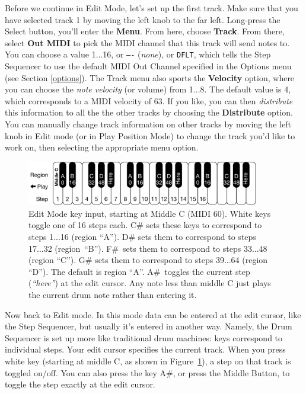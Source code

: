 \documentclass{article}
\begin{document}
Before we continue in Edit Mode, let's set up the first track.  Make sure that you have selected track 1 by moving the left knob to the far left.  Long-press the Select button, you'll enter the {\bf Menu}.  From here, choose {\bf Track}.  From there, select {\bf Out MIDI} to pick the MIDI channel that this track will send notes to.  You can choose a value 1...16, or \texttt{----} ({\it none}), or \texttt{DFLT}, which tells the Step Sequencer to use the default MIDI Out Channel specified in the Options menu (see Section \ref{options}).  The Track menu also sports the {\bf Velocity} option, where you can choose the {\it note velocity} (or volume) from 1...8.  The default value is 4, which corresponds to a MIDI velocity of 63.  If you like, you can then {\it distribute} this information to all the the other tracks by choosing the {\bf Distribute} option.  You can manually change track information on other tracks by moving the left knob in Edit mode (or in Play Position Mode) to change the track you'd like to work on, then selecting the appropriate menu option.

\begin{figure}
\vspace{-1em}
\hspace{\fill}\includegraphics[width=4in]{EditModeKeys}
\vspace{-1em}
\caption{\small Edit Mode key input, starting at Middle C (MIDI 60).  White keys toggle one of 16 steps each.  C\# sets these keys to correspond to steps 1...16 (region ``A'').  D\# sets them to correspond to steps 17...32 (region~``B'').  F\#~sets them to correspond to steps 33...48 (region ``C'').  G\# sets them to correspond to steps 39...64 (region ``D'').  The default is region ``A''.  A\#~toggles the current step ({\it ``here''}) at the edit cursor.  Any note less than middle C just plays the current drum note rather than entering it.
 }
\vspace{-1em}
\label{editmodekeys}
\end{figure}

Now back to Edit mode.  In this mode data can be entered at the edit cursor, like the Step Sequencer, but usually it's entered in another way.  Namely, the Drum Sequencer is set up more like traditional drum machines: keys correspond to individual steps.  Your edit cursor specifies the current track.  When you press white key (starting at middle C, as shown in Figure~\ref{editmodekeys}), a step on that track is toggled on/off.  You can also press the key A\#, or press the Middle Button, to toggle the step exactly at the edit cursor.  
\end{document}
